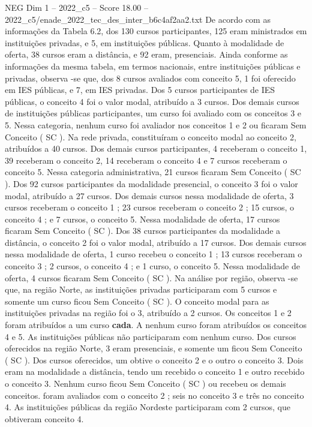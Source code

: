 \begin{textsample}{NEG Dim 1 – 2022\_c5 – Score 18.00 – 2022\_c5/enade\_2022\_tec\_des\_inter\_b6c4af2aa2.txt}
De acordo com as informações da Tabela 6.2, dos 130 cursos participantes, 125 eram ministrados em instituições privadas, e 5, em instituições públicas.
Quanto à modalidade de oferta, 38 cursos eram a distância, e 92 eram, presenciais.
Ainda conforme as informações da mesma tabela, em termos nacionais, entre instituições públicas e privadas, observa -se que, dos 8 cursos avaliados com conceito 5, 1 foi oferecido em IES públicas, e 7, em IES privadas.
Dos 5 cursos participantes de IES públicas, o conceito 4 foi o valor modal, atribuído a 3 cursos.
Dos demais cursos de instituições públicas participantes, um curso foi avaliado com os conceitos 3 e 5.
Nessa categoria, nenhum curso foi avaliador nos conceitos 1 e 2 ou ficaram Sem Conceito ( SC ).
Na rede privada, constituíram o conceito modal ao conceito 2, atribuídos a 40 cursos.
Dos demais cursos participantes, 4 receberam o conceito 1, 39 receberam o conceito 2, 14 receberam o conceito 4 e 7 cursos receberam o conceito 5.
Nessa categoria administrativa, 21 cursos ficaram Sem Conceito ( SC ).
Dos 92 cursos participantes da modalidade presencial, o conceito 3 foi o valor modal, atribuído a 27 cursos.
Dos demais cursos nessa modalidade de oferta, 3 cursos receberam o conceito 1 ; 23 cursos receberam o conceito 2 ; 15 cursos, o conceito 4 ; e 7 cursos, o conceito 5.
Nessa modalidade de oferta, 17 cursos ficaram Sem Conceito ( SC ).
Dos 38 cursos participantes da modalidade a distância, o conceito 2 foi o valor modal, atribuído a 17 cursos.
Dos demais cursos nessa modalidade de oferta, 1 curso recebeu o conceito 1 ; 13 cursos receberam o conceito 3 ; 2 cursos, o conceito 4 ; e 1 curso, o conceito 5.
Nessa modalidade de oferta, 4 cursos ficaram Sem Conceito ( SC ).
Na análise por região, observa -se que, na região Norte, as instituições privadas participaram com 5 cursos e somente um curso ficou Sem Conceito ( SC ).
O conceito modal para as instituições privadas na região foi o 3, atribuído a 2 cursos.
Os conceitos 1 e 2 foram atribuídos a um curso \textbf{cada}.
A nenhum curso foram atribuídos os conceitos 4 e 5.
As instituições públicas não participaram com nenhum curso.
Dos cursos oferecidos na região Norte, 3 eram presenciais, e somente um ficou Sem Conceito ( SC ).
Dos cursos oferecidos, um obtive o conceito 2 e o outro o conceito 3.
Dois eram na modalidade a distância, tendo um recebido o conceito 1 e outro recebido o conceito 3.
Nenhum curso ficou Sem Conceito ( SC ) ou recebeu os demais conceitos. foram avaliados com o conceito 2 ; seis no conceito 3 e três no conceito 4.
As instituições públicas da região Nordeste participaram com 2 cursos, que obtiveram conceito 4.

\end{textsample}
